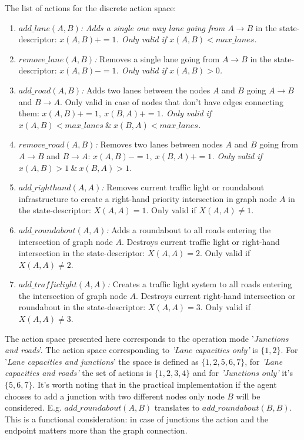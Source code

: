 \documentclass[
]{elteikthesis}[2023/04/10]
\begin{document}
The list of actions for the discrete action space: 
\begin{enumerate}
\item \emph{$add\_lane(A,B)$}\textit{: }\textit{\emph{Adds a single one
way lane going from $A\rightarrow B$}} in the state-descriptor:\textit{\emph{
$x(A,B)+=1$. Only valid if $x(A,B)<max\_lanes$.}}
\item \emph{$remove\_lane(A,B)$: }Removes a single lane going from $A\rightarrow B$
in the state-descriptor: \textit{\emph{$x(A,B)-=1$. Only valid if
$x(A,B)>0$.}}
\item \emph{$add\_road(A,B)$: }Adds two lanes between the nodes $A$ and
$B$ going $A\rightarrow B$ and $B\rightarrow A$. Only valid in
case of nodes that don't have edges connecting them: \textit{\emph{$x(A,B)+=1,\ x(B,A)+=1$.
Only valid if $x(A,B)<max\_lanes\ \&\ x(B,A)<max\_lanes$.}}
\item \emph{$remove\_road(A,B)$: }Removes two lanes between nodes $A$
and $B$ going from $A\rightarrow B$ and $B\rightarrow A$: \textit{\emph{$x(A,B)-=1,\ x(B,A)+=1$.
Only valid if $x(A,B)>1\ \&\ x(B,A)>1$.}}
\item \emph{$add\_righthand(A,A)$: }Removes current traffic light or roundabout
infrastructure to create a right-hand priority intersection in graph
node $A$ in the state-descriptor: $X(A,A)=1$. Only valid if $X(A,A)\neq1$.
\item \emph{$add\_roundabout(A,A)$: }Adds a roundabout to all roads entering
the intersection of graph node $A$. Destroys current traffic light
or right-hand intersection in the state-descriptor: $X(A,A)=2$. Only
valid if $X(A,A)\neq2.$
\item \emph{$add\_trafficlight(A,A)$: }Creates a traffic light system to
all roads entering the intersection of graph node $A$. Destroys current
right-hand intersection or roundabout in the state-descriptor: $X(A,A)=3$.
Only valid if $X(A,A)\neq3.$
\end{enumerate}
The action space presented here corresponds to the operation mode
'\emph{Junctions and roads}'. The action space corresponding to \emph{'Lane
capacities only' }is $\{1,2\}$. For '\emph{Lane capacities and junctions}'
the space is defined as $\{1,2,5,6,7\}$, for \emph{'Lane capacities
and roads' }the set of actions is $\{1,2,3,4\}$ and for \emph{'Junctions
only' }it's $\{5,6,7\}$. It's worth noting that in the practical
implementation if the agent chooses to add a junction with two different
nodes only node $B$ will be considered. E.g. $add\_roundabout(A,B)$
translates to $add\_roundabout(B,B)$. This is a functional consideration:
in case of junctions the action and the endpoint matters more than
the graph connection. 
\end{document}
